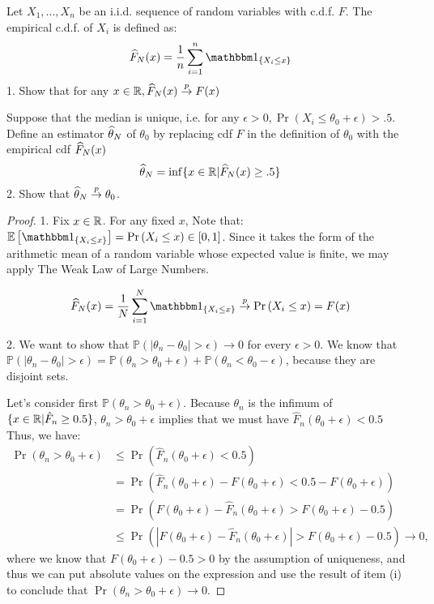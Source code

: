 \documentclass[12pt, letterpaper]{paper}
\begin{document}
\begin{question}
  Let $X_1, ..., X_n$ be an i.i.d. sequence of random variables with
  c.d.f. $F$. The empirical c.d.f. of $X_i$ is defined as:
  \begin{equation*}
    \est{F}(x) = \frac{1}{n} \sum_{i = 1}^n \indicate{X_i \leq x}
  \end{equation*}
  1. Show that for any $x \in \mathbb{R}, \widehat{ F }_{N}(x) \overset{p}{\to} F(x)$

  \vspace{.25in}
  
  Suppose that the median is unique, i.e. for any
  $\epsilon > 0, \Pr( X_i \leq \theta_0 + \epsilon) > .5$. Define an estimator
  $\widehat{ \theta }_{N}$ of $\theta_0$ by replacing cdf $F$ in the definition of
  $\theta_0$ with the empirical cdf $\widehat{ F }_{N}(x)$
  \begin{equation*}
    \widehat{ \theta }_{N} = \inf\{ x \in \mathbb{R} | \widehat{ F }_{N}(x) \geq .5 \}
  \end{equation*}
  2. Show that $\widehat{ \theta }_{N} \overset{p}{\to} \theta_0$.

    \begin{proof}
      1. Fix $x \in \mathbb{R}$. For any fixed $x$, Note that:
      $\exV{\indicate{X_i \leq x}} = \Pr \left( X_i \leq x \right ) \in
      [0,1]$. Since it takes the form of the arithmetic mean of a
      random variable whose expected value is finite, we may apply The
      Weak Law of Large Numbers.

      \begin{equation*}
        \est{F}(x) = \frac{1}{N} \sum_{i=1}^N \indicate{ X_i \leq x} \plim \Pr \left(  X_i \leq x \right ) = F(x)
      \end{equation*}

      2.
      We want to show that $\mathbb{P}(|\theta_n-\theta_0|>\epsilon)\rightarrow 0$ for every $\epsilon>0$. We know that $\mathbb{P}(|\theta_n-\theta_0|>\epsilon)=\mathbb{P}(\theta_n>\theta_0+\epsilon)+\mathbb{P}(\theta_n<\theta_0-\epsilon)$, because they are disjoint sets.

Let's consider first $\mathbb{P}(\theta_n>\theta_0+\epsilon)$. Because $\theta_n$ is the
infimum of $\{x\in\mathbb{R}|\hat{F}_n\ge 0.5\}$, $\theta_n>\theta_0+\epsilon$ implies that we must have $\hat{F}_n(\theta_0+\epsilon)<0.5$ Thus, we have:
\begin{equation}
    \begin{split}
        \Pr(\theta_n>\theta_0+\epsilon)&\le \Pr(\hat{F}_n(\theta_0+\epsilon)<0.5)\\
        &=\Pr(\hat{F}_n(\theta_0+\epsilon)-F(\theta_0+\epsilon)<0.5-F(\theta_0+\epsilon))\\
        &=\Pr(F(\theta_0+\epsilon)-\hat{F}_n(\theta_0+\epsilon)>F(\theta_0+\epsilon)-0.5)\\
        &\le \Pr(|F(\theta_0+\epsilon)-\hat{F}_n(\theta_0+\epsilon)|>F(\theta_0+\epsilon)-0.5)\to 0,
    \end{split}
\end{equation}
\noindent where we know that $F(\theta_0+\epsilon)-0.5>0$ by the assumption of uniqueness, and thus we can put absolute values on the expression and use the result of item (i) to conclude that $\Pr(\theta_n>\theta_0+\epsilon)\to 0$.


\end{proof}
\end{question}
\end{document}
